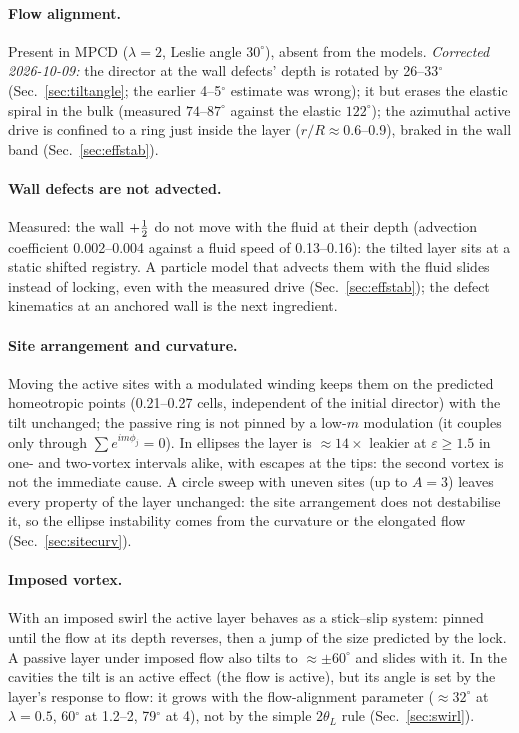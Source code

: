 \paragraph{Flow alignment.} Present in MPCD ($\lambda=2$, Leslie angle $30^\circ$), absent from the models. \emph{Corrected 2026-10-09:} the director at the wall defects' depth is rotated by 26--33$^\circ$
(Sec.~\ref{sec:tiltangle}; the earlier 4--5$^\circ$ estimate was wrong); it but erases the elastic spiral in the bulk (measured $74$--$87^\circ$ against the elastic $122^\circ$); the azimuthal active drive is confined to a ring
just inside the layer ($r/R\approx0.6$--0.9), braked in the wall band (Sec.~\ref{sec:effstab}).

\paragraph{Wall defects are not advected.} Measured: the wall $+\tfrac12$ do not move with the fluid at their depth (advection coefficient 0.002--0.004 against
a fluid speed of 0.13--0.16): the tilted layer sits at a static shifted registry. A particle model that advects them with the fluid slides instead of locking, even
with the measured drive (Sec.~\ref{sec:effstab}); the defect kinematics at an anchored wall is the next ingredient.

\paragraph{Site arrangement and curvature.} Moving the active sites with a modulated winding keeps them on the predicted homeotropic points (0.21--0.27 cells,
independent of the initial director) with the tilt unchanged; the passive ring is not pinned by a low-$m$ modulation (it couples only through $\sum e^{im\phi_j}=0$). In ellipses the layer is $\approx14\times$ leakier at $\varepsilon\ge1.5$ in one- and two-vortex intervals alike, with escapes at
the tips: the second vortex is not the immediate cause. A circle sweep with uneven sites (up to $A=3$) leaves every property of the layer unchanged: the site arrangement
does not destabilise it, so the ellipse instability comes from the curvature or the elongated flow (Sec.~\ref{sec:sitecurv}).

\paragraph{Imposed vortex.} With an imposed swirl the active layer behaves as a stick--slip system: pinned until the flow at its depth reverses, then a jump
of the size predicted by the lock. A passive layer under imposed flow also tilts to $\approx\pm60^\circ$ and slides with it. In the cavities the tilt is an active effect (the flow is active), but
its angle is set by the layer's response to flow: it grows with the flow-alignment parameter ($\approx32^\circ$ at $\lambda=0.5$, 60$^\circ$ at 1.2--2, 79$^\circ$ at 4),
not by the simple $2\theta_L$ rule (Sec.~\ref{sec:swirl}).

